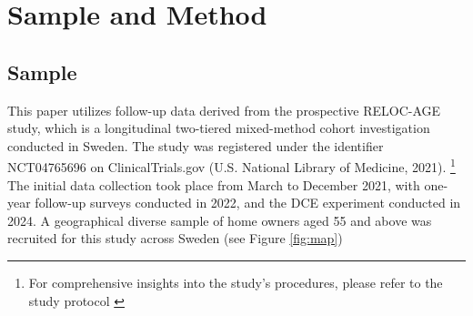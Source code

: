\documentclass[3p,11pt ]{elsarticle}
\begin{document}
\section{Sample and Method}

\subsection{Sample}

This paper utilizes follow-up data derived from the prospective RELOC-AGE study,
which is a longitudinal two-tiered mixed-method cohort investigation conducted in Sweden.
The study was registered under the identifier NCT04765696 on ClinicalTrials.gov (U.S. National Library of Medicine, 2021).
\footnote{For comprehensive insights into the study's procedures,
please refer to the study protocol  \cite{zingmarkExploringAssociationsHousing2021}}
The initial data collection took place from March to December 2021, with one-year follow-up surveys conducted in 2022, and the DCE experiment conducted in 2024.
A geographical diverse sample of home owners aged 55 and above was recruited for this study across Sweden (see Figure \ref{fig:map})
\end{document}
